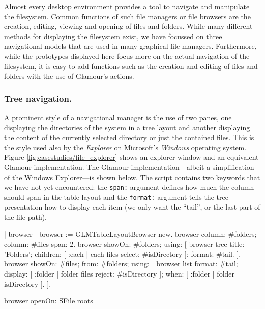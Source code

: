 \documentclass[a4paper,10pt,twoside]{book}
\begin{document}
Almost every desktop environment provides a tool to navigate and
manipulate the filesystem. Common functions of such file managers or
file browsers are the creation, editing, viewing and opening of files
and folders. While many different methods for displaying the
filesystem exist, we have focussed on three navigational models that
are used in many graphical file managers. Furthermore, while the
prototypes displayed here focus more on the actual navigation of the
filesystem, it is easy to add functions such as the creation and
editing of files and folders with the use of Glamour's actions.


\subsubsection{Tree navigation.} A prominent style of a navigational
manager is the use of two panes, one displaying the directories of the
system in a tree layout and another displaying the content of the
currently selected directory or just the contained files. This is the
style used also by the \emph{Explorer} on Microsoft's \emph{Windows}
operating system. Figure \ref{fig:casestudies/file_explorer} shows an
explorer window and an equivalent Glamour implementation. The Glamour
implementation---albeit a simplification of the Windows Explorer---is
shown below. The script contains two keywords that we have not yet
encountered: the \texttt{span:} argument defines how much the column
should span in the table layout and the \texttt{format:} argument
tells the tree presentation how to display each item (we only want the
``tail'', or the last part of the file path).

\begin{code}{}
| browser |
browser := GLMTableLayoutBrowser new.
browser
   column: #folders;
   column: #files span: 2.
browser showOn: #folders; using: [
   browser tree
     title: 'Folders';
     children: [ :each | each files select: #isDirectory ];
     format: #tail.
].
browser showOn: #files; from: #folders; using: [
   browser list
     format: #tail;
     display: [ :folder | folder files reject: #isDirectory ];
     when: [ :folder | folder isDirectory ].
].

browser openOn: SFile roots
\end{code}
\end{document}

